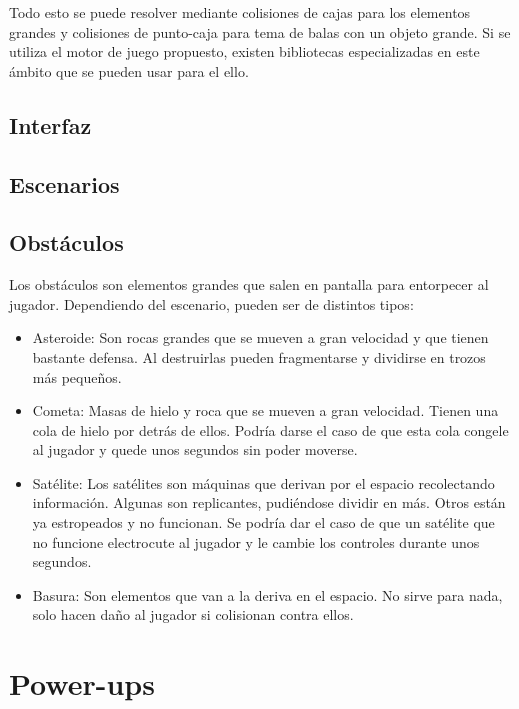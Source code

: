 \documentclass[12pt, spanish, a4paper]{article}
\begin{document}
	Todo esto se puede resolver mediante colisiones de cajas para los elementos grandes y colisiones de punto-caja para tema de balas con un objeto grande. Si se utiliza el motor de juego propuesto, existen bibliotecas especializadas en este ámbito que se pueden usar para el ello.
	
	\subsection{Interfaz}
	
	\lipsum[13]
	
	\subsection{Escenarios}
	
	\lipsum[14]
	
	\subsection{Obstáculos}
	
	Los obstáculos son elementos grandes que salen en pantalla para entorpecer al jugador. Dependiendo del escenario, pueden ser de distintos tipos:
	
	\begin{itemize}
		\item Asteroide: Son rocas grandes que se mueven a gran velocidad y que tienen bastante defensa. Al destruirlas pueden fragmentarse y dividirse en trozos más pequeños.
		\item Cometa: Masas de hielo y roca que se mueven a gran velocidad. Tienen una cola de hielo por detrás de ellos. Podría darse el caso de que esta cola congele al jugador y quede unos segundos sin poder moverse.
		\item Satélite: Los satélites son máquinas que derivan por el espacio recolectando información. Algunas son replicantes, pudiéndose dividir en más. Otros están ya estropeados y no funcionan. Se podría dar el caso de que un satélite que no funcione electrocute al jugador y le cambie los controles durante unos segundos.
		\item Basura: Son elementos que van a la deriva en el espacio. No sirve para nada, solo hacen daño al jugador si colisionan contra ellos.
	\end{itemize}
	
	\section{Power-ups}
	
\end{document}
